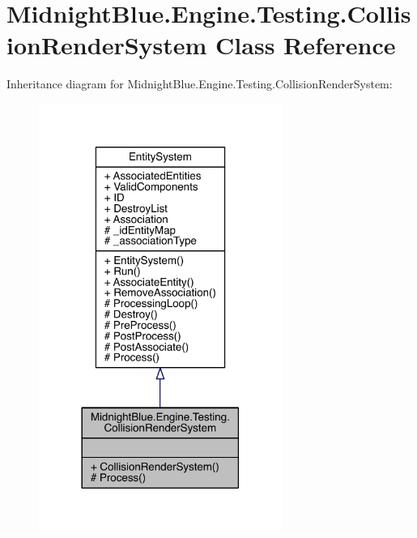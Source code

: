\hypertarget{class_midnight_blue_1_1_engine_1_1_testing_1_1_collision_render_system}{}\section{Midnight\+Blue.\+Engine.\+Testing.\+Collision\+Render\+System Class Reference}
\label{class_midnight_blue_1_1_engine_1_1_testing_1_1_collision_render_system}


Inheritance diagram for Midnight\+Blue.\+Engine.\+Testing.\+Collision\+Render\+System\+:
\nopagebreak
\begin{figure}[H]
\begin{center}
\leavevmode
\includegraphics[width=225pt]{class_midnight_blue_1_1_engine_1_1_testing_1_1_collision_render_system__inherit__graph}
\end{center}
\end{figure}


